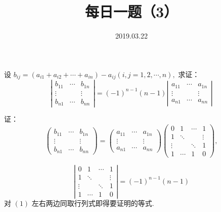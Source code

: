 \documentclass[UTF8]{ctexart}
\title{\textbf{每日一题（3）}}
\date{2019.03.22}
\begin{document}
\maketitle
设 $b_{ij} = (a_{i1} + a_{i2} + \cdots + a_{in}) - a_{ij}(i,j=1,2,\cdots,n),$ 求证：
\[
\left|\begin{array}{ccc}
  b_{11} & \cdots & b_{1n} \\
  \vdots &   & \vdots \\
  b_{n1} & \cdots & b_{nn}
\end{array}\right|
=(-1)^{n-1}(n-1)
\left|\begin{array}{ccc}
        a_{11} & \cdots & a_{1n} \\
        \vdots &   & \vdots \\
        a_{n1} & \cdots & a_{nn}
      \end{array}\right|
\]

证：
\begin{equation}
    \left( \begin{array}{ccc}
        b_{11} & \cdots & b_{1n} \\
        \vdots &   & \vdots \\
        b_{n1} & \cdots & b_{nn}
      \end{array} \right)
=\left(
\begin{array}{ccc}
a_{11} & \cdots & a_{1n} \\
\vdots &   & \vdots \\
a_{n1} & \cdots & a_{nn}
\end{array}
\right)
\left(
\begin{array}{cccc}
  0 & 1 & \cdots & 1 \\
  1 & \ddots &   & \vdots \\
  \vdots &   & \ddots & 1 \\
  1 & \cdots & 1 & 0
\end{array}
\right),
\end{equation}

\begin{equation*}
  \left| \begin{array}{cccc}
  0 & 1 & \cdots & 1 \\
  1 & \ddots &   & \vdots \\
  \vdots &   & \ddots & 1 \\
  1 & \cdots & 1 & 0
  \end{array} \right|
  =(-1)^{n-1}(n-1)
\end{equation*}
对 $(1)$ 左右两边同取行列式即得要证明的等式.
\end{document}
